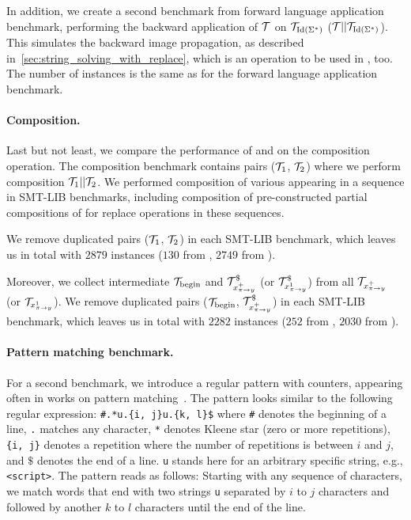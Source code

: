 In addition, we create a second benchmark from forward language application benchmark, performing the backward application of $\mathcal{T}$ on $\mathcal{T}_{\text{Id}(\Sigma^*)}$ ($ \mathcal{T} || \mathcal{T}_{\text{Id}(\Sigma^*)}$).
This simulates the backward image propagation, as described in~\ref{sec:string_solving_with_replace}, which is an operation to be used in \noodler, too.
The number of instances is the same as for the forward language application benchmark.

\paragraph{Composition.}
Last but not least, we compare the performance of \mata and \mona on the composition operation.
The composition benchmark contains pairs ($\mathcal{T}_1$, $\mathcal{T}_2$) where we perform composition $\mathcal{T}_1 || \mathcal{T}_2$.
We performed composition of various \nfts appearing in a sequence in SMT-LIB benchmarks, including composition of pre-constructed partial compositions of \nfts for replace operations in these sequences.

We remove duplicated pairs ($\mathcal{T}_1$, $\mathcal{T}_2$) in each SMT-LIB benchmark, which leaves us in total with $2879$ instances ($130$ from \webapp, $2749$ from \transducerPlus).

Moreover, we collect intermediate \nfts $\mathcal{T}_{\text{begin}}$ and $\mathcal{T}^\$_{x^{+}_{\pi \rightarrow y}}$ (or $\mathcal{T}^\$_{x^{1}_{\pi \rightarrow y}}$) from all $\mathcal{T}_{x^{+}_{\pi \rightarrow y}}$ (or $\mathcal{T}_{x^{1}_{\pi \rightarrow y}}$).
We remove duplicated pairs ($\mathcal{T}_{\text{begin}}$, $\mathcal{T}^\$_{x^{+}_{\pi \rightarrow y}}$) in each SMT-LIB benchmark, which leaves us in total with $2282$ instances ($252$ from \webapp, $2030$ from \transducerPlus).

\paragraph{Pattern matching benchmark.}

For a second benchmark, we introduce a regular pattern with counters, appearing often in works on pattern matching~\cite{10.1007/978-3-031-30829-1_19}.
The pattern looks similar to the following regular expression:
\texttt{\#.*u.\{i, j\}u.\{k, l\}\$} where
\texttt{\#} denotes the beginning of a line, \texttt{.} matches any character, \texttt{*} denotes Kleene star (zero or more repetitions), \texttt{\{i, j\}} denotes a repetition where the number of repetitions is between $i$ and $j$, and $\$$ denotes the end of a line. \texttt{u} stands here for an arbitrary specific string, e.g., \texttt{<script>}.
The pattern reads as follows: Starting with any sequence of characters, we match words that end with two strings \texttt{u} separated by $i$ to $j$ characters and followed by another $k$ to $l$ characters until the end of the line.

